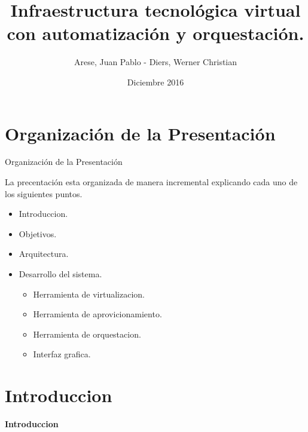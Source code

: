 \documentclass{beamer}
\title[Your Short Title]{Infraestructura tecnológica virtual con automatización y orquestación.}
\author{Arese, Juan Pablo - Diers, Werner Christian}
\institute{Facultad de Ciencias Exactas, Físicas y Naturales - UNC}
\date{Diciembre 2016}
\begin{document}
\begin{frame}
  \titlepage
\end{frame}

\section{Organización de la Presentación}

\begin{frame}{Organización de la Presentación}

\vspace{-1.5cm}
La precentación esta organizada de manera incremental explicando cada uno de los siguientes puntos.\\
\begin{itemize}
    \item Introduccion.
    \item Objetivos.
    \item Arquitectura.
    \item Desarrollo del sistema.
    \begin{itemize}
        \item Herramienta de virtualizacion.
        \item Herramienta de aprovicionamiento.
        \item Herramienta de orquestacion.
        \item Interfaz grafica.
    \end{itemize}
\end{itemize}

\end{frame}


\section{Introduccion}


\begin{frame}
    \Huge
    \centering
    \textbf{ Introduccion }

\end{frame}
\end{document}

